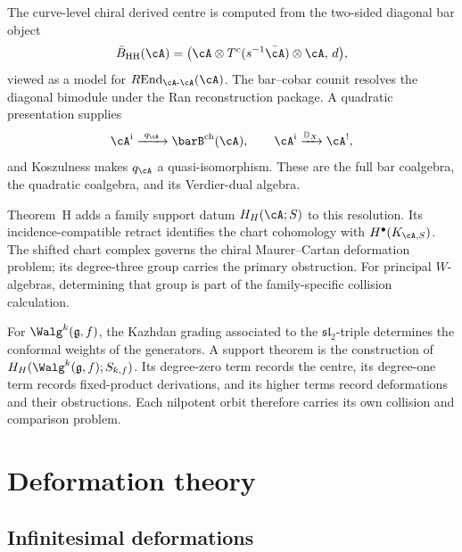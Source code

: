 \begin{remark}
\label{rem:theorem-h-model}
The curve-level chiral derived centre is computed from the two-sided
diagonal bar object
\[
 \bar{B}_{\mathrm{HH}}(\cA)
 =
 \bigl(\cA\otimes T^c(s^{-1}\bar\cA)\otimes\cA,\,d\bigr),
\]
viewed as a model for
$R\!\operatorname{End}_{\cA\text{-}\cA}(\cA)$.  The bar--cobar counit
resolves the diagonal bimodule under the Ran reconstruction package.
A quadratic presentation supplies
\[
 \cA^{\mathrm i}
 \xrightarrow{\ q_\cA\ }
 \barB^{\mathrm{ch}}(\cA),
 \qquad
 \cA^{\mathrm i}
 \xrightarrow{\mathbb D_X}
 \cA^!,
\]
and Koszulness makes $q_\cA$ a quasi-isomorphism.  These are the full
bar coalgebra, the quadratic coalgebra, and its Verdier-dual algebra.

Theorem~H adds a family support datum
$H_H(\cA;S)$ to this resolution.  Its incidence-compatible retract
identifies the chart cohomology with $H^\bullet(K_{\cA,S})$.  The
shifted chart complex governs the chiral Maurer--Cartan deformation
problem; its degree-three group carries the primary obstruction.
For principal $W$-algebras, determining that group is part of the
family-specific collision calculation.
\end{remark}

\begin{remark}
For $\Walg^k(\mathfrak g,f)$, the Kazhdan grading associated to the
$\mathfrak{sl}_2$-triple determines the conformal weights of the
generators.  A support theorem is the construction of
$H_H(\Walg^k(\mathfrak g,f);S_{k,f})$.  Its degree-zero term records
the centre, its degree-one term records fixed-product derivations, and
its higher terms record deformations and their obstructions.  Each
nilpotent orbit therefore carries its own collision and comparison
problem.
\end{remark}

\section{Deformation theory}

\subsection{Infinitesimal deformations}

